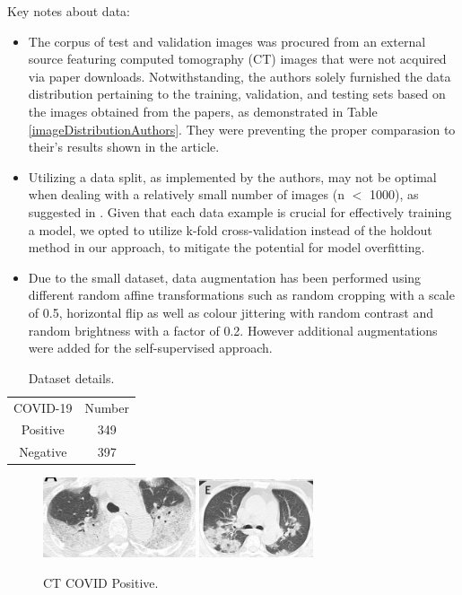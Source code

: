 \documentclass[runningheads]{llncs}
\begin{document}
Key notes about data:
\begin{itemize}
  \item The corpus of test and validation images was procured from an external source featuring computed tomography (CT) images that were not acquired via paper downloads. Notwithstanding, the authors solely furnished the data distribution pertaining to the training, validation, and testing sets based on the images obtained from the papers, as demonstrated in Table \ref{imageDistributionAuthors}. They were preventing the proper comparasion to their's results shown in the article.
  \item Utilizing a data split, as implemented by the authors, may not be optimal when dealing with a relatively small number of images (n $<$ 1000), as suggested in \cite{kfoldcrossvalidationN1000}. Given that each data example is crucial for effectively training a model, we opted to utilize k-fold cross-validation instead of the holdout method in our approach, to mitigate the potential for model overfitting.
  \item Due to the small dataset, data augmentation has been performed using different random affine transformations such as random cropping with a scale of 0.5, horizontal flip as well as colour jittering with random contrast and random brightness with a factor of 0.2. However additional augmentations were added for the self-supervised approach.
\end{itemize}

\begin{table}[H]
\label{imageDetails}
\centering
\caption{Dataset details.}
\begin{tabular}{c|c}
\cline{1-2}
 COVID-19 & Number \\ \cline{1-2}
 Positive & 349 \\ \cline{1-2}
 Negative & 397  \\ \cline{1-2}
\end{tabular}
\end{table} 

\begin{figure}[H]
\centering
{
\includegraphics[width=0.40\textwidth]{imagesDatasetSection/covid1.png}
}
\quad
{
\includegraphics[width=0.30\textwidth]{imagesDatasetSection/covid2.png}
}
\label{covidPositive}
\caption{CT COVID Positive.}
\end{figure}
\end{document}
